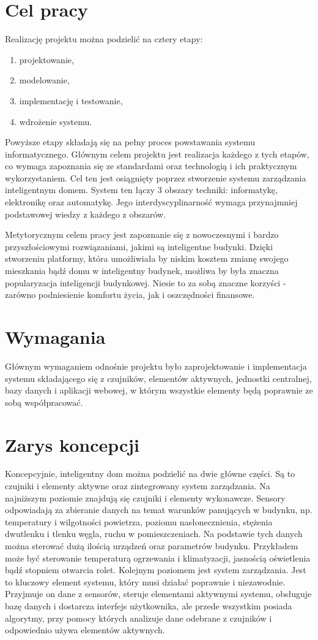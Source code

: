 \documentclass[eng,oneside]{mgr}
\begin{document}
\section{Cel pracy}
Realizację projektu można podzielić na cztery etapy:
\begin{enumerate}
	\item projektowanie,
	\item modelowanie,
	\item implementację i testowanie,
	\item wdrożenie systemu.
\end{enumerate}
Powyższe etapy składają się na pełny proces powstawania systemu informatycznego. Głównym celem projektu jest realizacja każdego z tych etapów, co wymaga zapoznania się ze standardami oraz technologią i ich praktycznym wykorzystaniem. Cel ten jest osiągnięty poprzez stworzenie systemu zarządzania inteligentnym domem. System ten łączy 3 obszary techniki: informatykę, elektronikę oraz automatykę. Jego interdyscyplinarność wymaga przynajmniej podstawowej wiedzy z każdego z obszarów.

Metytorycznym celem pracy jest zapoznanie się z nowoczesnymi i bardzo przyszłościowymi rozwiązaniami, jakimi są inteligentne budynki. Dzięki stworzeniu platformy, która umożliwiała by niskim kosztem zmianę swojego mieszkania bądź domu w inteligentny budynek, możliwa by była znaczna popularyzacja inteligencji budynkowej. Niesie to za sobą znaczne korzyści - zarówno podniesienie komfortu życia, jak i oszczędności finansowe.

\section{Wymagania}
Głównym wymaganiem odnośnie projektu było zaprojektowanie i implementacja systemu składającego się z czujników, elementów aktywnych, jednostki centralnej, bazy danych i aplikacji webowej, w którym wszystkie elementy będą poprawnie ze sobą współpracować.

\section{Zarys koncepcji}
Koncepcyjnie, inteligentny dom można podzielić na dwie główne części. Są to czujniki i elementy aktywne oraz zintegrowany system zarządzania. Na najniższym poziomie znajdują się czujniki i elementy wykonawcze. Sensory odpowiadają za zbieranie danych na temat warunków panujących w budynku, np. temperatury i wilgotności powietrza, poziomu nasłonecznienia, stężenia dwutlenku i tlenku węgla, ruchu w pomieszczeniach. Na podstawie tych danych można sterować dużą ilością urządzeń oraz parametrów budynku. Przykładem może być sterowanie temperaturą ogrzewania i klimatyzacji, jasnością oświetlenia bądź stopniem otwarcia rolet. Kolejnym poziomem jest system zarządzania. Jest to kluczowy element systemu, który musi działać poprawnie i niezawodnie. Przyjmuje on dane z sensorów, steruje elementami aktywnymi systemu, obsługuje bazę danych i dostarcza interfejs użytkownika, ale przede wszystkim posiada algorytmy, przy pomocy których analizuje dane odebrane z czujników i odpowiednio używa elementów aktywnych.
\end{document}
